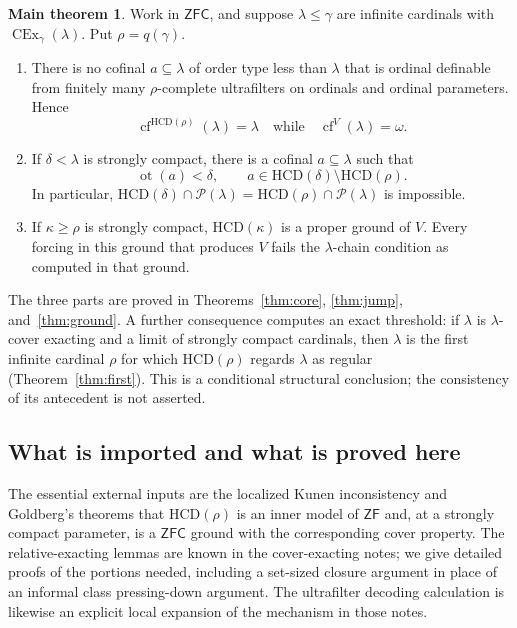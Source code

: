 \documentclass[11pt,letterpaper]{article}
\theoremstyle{definition}
\newcommand{\ZFC}{\mathsf{ZFC}}
\newcommand{\ZF}{\mathsf{ZF}}
\newcommand{\CEx}{\operatorname{CEx}}
\newcommand{\cf}{\operatorname{cf}}
\newcommand{\ot}{\operatorname{ot}}
\newcommand{\HCD}{\mathrm{HCD}}
\newcommand{\Pow}{\mathcal{P}}
\newtheorem*{maintheorem}{Main theorem}
\begin{document}
\begin{maintheorem}
Work in $\ZFC$, and suppose $\lambda\leq\gamma$ are infinite cardinals with $\CEx_\gamma(\lambda)$. Put $\rho=q(\gamma)$.
\begin{enumerate}
\item There is no cofinal $a\subseteq\lambda$ of order type less than $\lambda$ that is ordinal definable from finitely many $\rho$-complete ultrafilters on ordinals and ordinal parameters. Hence
\[
 \cf^{\HCD(\rho)}(\lambda)=\lambda
 \quad\text{while}\quad \cf^V(\lambda)=\omega.
\]
\item If $\delta<\lambda$ is strongly compact, there is a cofinal $a\subseteq\lambda$ such that
\[
 \ot(a)<\delta,
 \qquad a\in\HCD(\delta)\setminus\HCD(\rho).
\]
In particular, $\HCD(\delta)\cap\Pow(\lambda)=\HCD(\rho)\cap\Pow(\lambda)$ is impossible.
\item If $\kappa\geq\rho$ is strongly compact, $\HCD(\kappa)$ is a proper ground of $V$. Every forcing in this ground that produces $V$ fails the $\lambda$-chain condition as computed in that ground.
\end{enumerate}
\end{maintheorem}

The three parts are proved in Theorems~\ref{thm:core}, \ref{thm:jump}, and~\ref{thm:ground}. A further consequence computes an exact threshold: if $\lambda$ is $\lambda$-cover exacting and a limit of strongly compact cardinals, then $\lambda$ is the first infinite cardinal $\rho$ for which $\HCD(\rho)$ regards $\lambda$ as regular (Theorem~\ref{thm:first}). This is a conditional structural conclusion; the consistency of its antecedent is not asserted.

\subsection{What is imported and what is proved here}

The essential external inputs are the localized Kunen inconsistency and Goldberg's theorems that $\HCD(\rho)$ is an inner model of $\ZF$ and, at a strongly compact parameter, is a $\ZFC$ ground with the corresponding cover property.\cite{kunen,hkp,uniqueness} The relative-exacting lemmas are known in the cover-exacting notes; we give detailed proofs of the portions needed, including a set-sized closure argument in place of an informal class pressing-down argument. The ultrafilter decoding calculation is likewise an explicit local expansion of the mechanism in those notes.\cite{cover}
\end{document}

